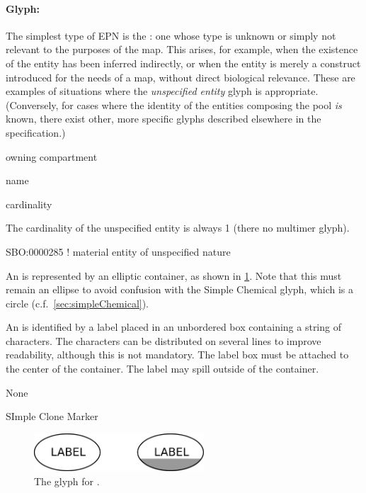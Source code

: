 
\paragraph{Glyph: }
\label{sec:unspecifiedEntity}

The simplest type of EPN is the : one whose type is unknown or simply not relevant to the purposes of the map.  This arises, for example, when the existence of the entity has been inferred indirectly, or when the entity is merely a construct introduced for the needs of a map, without direct biological relevance.  These are examples of situations where the \emph{unspecified entity} glyph is appropriate.  (Conversely, for cases where the identity of the entities composing the pool \emph{is} known, there exist other, more specific glyphs described elsewhere in the specification.)

\begin{glyphDescription}

 \begin{glyphIdentity}
  \item owning compartment
  \item name
  \item cardinality
  \end{glyphIdentity}
\glyphRules The cardinality of
  the unspecified entity is always 1 (there no multimer glyph).


\glyphSboTerm SBO:0000285 ! material entity of unspecified nature 

\glyphContainer An  is represented by an
elliptic container, as shown in \ref{fig:unspecified}.  Note that this
must remain an ellipse to avoid confusion with the Simple Chemical
glyph, which is a circle (c.f.\, \ref{sec:simpleChemical}).

\glyphLabel An  is identified by a label
placed in an unbordered box containing a string of characters.  The
characters can be distributed on several lines to improve readability,
although this is not mandatory.  The label box must be attached to the
center of the container.  The label may spill outside of the
container.

\glyphAux None

\glyphCloning SImple Clone Marker

\end{glyphDescription}

\begin{figure}[H]
  \centering
  \includegraphics[width=2.5in]{images/unspecified}
  \caption{The \PD glyph for .}
  \label{fig:unspecified}
\end{figure}

